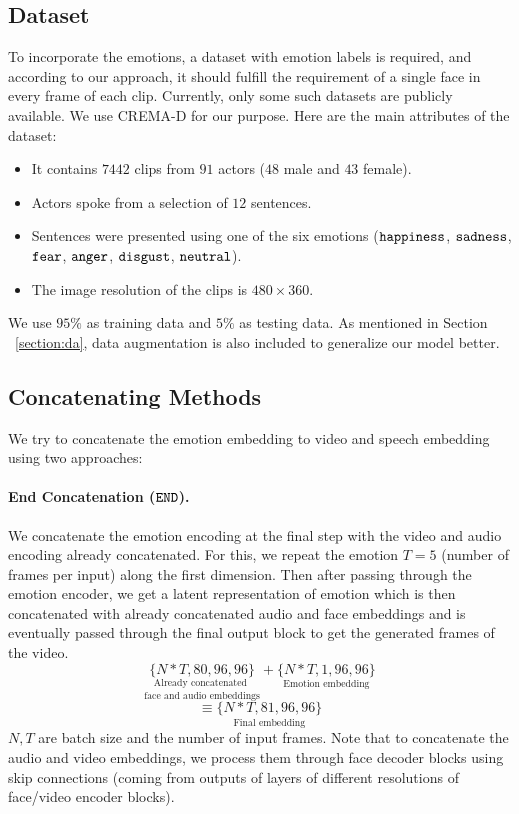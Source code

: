 \documentclass[accepted]{uai2023}
\begin{document}
\subsection{Dataset}
To incorporate the emotions, a dataset with emotion labels is required, and according to our approach, it should fulfill the requirement of a single face in every frame of each clip.
Currently, only some such datasets are publicly available. 
We use CREMA-D for our purpose. Here are the main attributes of the dataset:
\begin{itemize}
    \item It contains $7442$ clips from $91$ actors ($48$ male and $43$ female).
    \item Actors spoke from a selection of $12$ sentences.
    \item Sentences were presented using one of the six emotions ({${\tt happiness}$}, {${\tt sadness}$}, {${\tt fear}$}, {${\tt anger}$}, {${\tt disgust}$}, {${\tt neutral}$}).
    \item The image resolution of the clips is $480 \times 360$.
\end{itemize}
We use $95\%$ as training data and $5\%$ as testing data. 
As mentioned in Section ~\ref{section:da}, data augmentation is also included to generalize our model better.




\subsection{Concatenating Methods}
\label{section:cm}
We try to concatenate the emotion embedding to video and speech embedding using two approaches:
\paragraph{End Concatenation (${\tt END}$).}
    We concatenate the emotion encoding at the final step with the video and audio encoding already concatenated. For this, we repeat the emotion $T=5$ (number of frames per input) along the first dimension. Then after passing through the emotion encoder, we get a latent representation of emotion which is then concatenated with already concatenated audio and face embeddings and is eventually passed through the final output block to get the generated frames of the video. 
        $$\underset{\text{face and audio embeddings}}{\underset{\text{Already concatenated }}{\{N*T,80,96,96\}}} + \underset{\text{Emotion embedding}}{\{N*T,1,96,96\}}$$
        $$ \equiv \underset{\text{Final embedding}}{\{N*T,81,96,96\}}$$
        $N, T$ are batch size and the number of input frames.
    Note that to concatenate the audio and video embeddings, we process them through face decoder blocks using skip connections (coming from outputs of layers of different resolutions of face/video encoder blocks).
\end{document}
